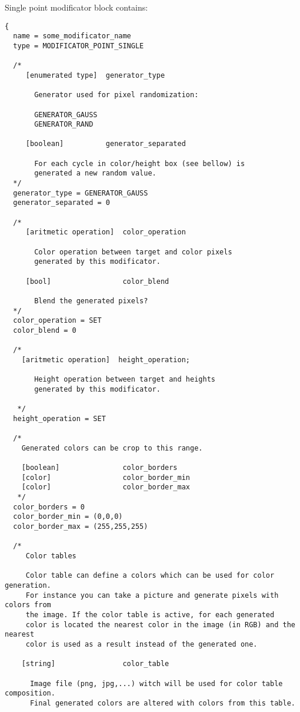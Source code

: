 \documentclass[9pt]{article}
\begin{document}
Single point modificator block contains:
\begin{verbatim}
{
  name = some_modificator_name
  type = MODIFICATOR_POINT_SINGLE

  /*    
     [enumerated type]  generator_type
     
       Generator used for pixel randomization:
       
       GENERATOR_GAUSS
       GENERATOR_RAND
      
     [boolean]          generator_separated
     
       For each cycle in color/height box (see bellow) is
       generated a new random value.
  */
  generator_type = GENERATOR_GAUSS
  generator_separated = 0
    
  /*      
     [aritmetic operation]  color_operation
     
       Color operation between target and color pixels 
       generated by this modificator.
     
     [bool]                 color_blend
     
       Blend the generated pixels?
  */      
  color_operation = SET
  color_blend = 0
  
  /*      
    [aritmetic operation]  height_operation;
    
       Height operation between target and heights
       generated by this modificator.
    
   */
  height_operation = SET

  /*
    Generated colors can be crop to this range.
  
    [boolean]               color_borders
    [color]                 color_border_min
    [color]                 color_border_max
   */
  color_borders = 0
  color_border_min = (0,0,0)
  color_border_max = (255,255,255)
  
  /*
     Color tables 
     
     Color table can define a colors which can be used for color generation. 
     For instance you can take a picture and generate pixels with colors from
     the image. If the color table is active, for each generated
     color is located the nearest color in the image (in RGB) and the nearest 
     color is used as a result instead of the generated one.
     
    [string]                color_table
      
      Image file (png, jpg,...) witch will be used for color table composition. 
      Final generated colors are altered with colors from this table.
    

\end{verbatim}
\end{document}
